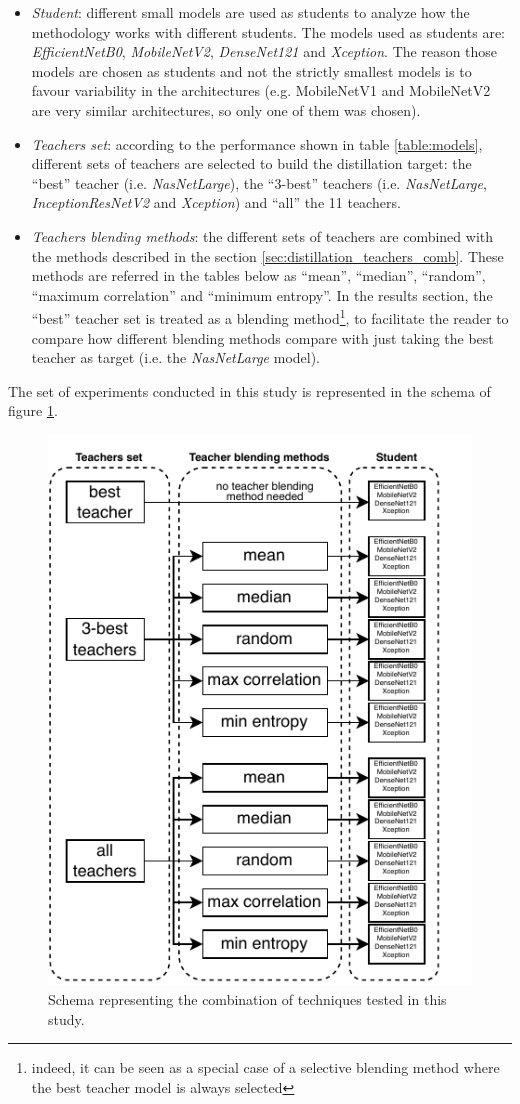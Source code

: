  \begin{itemize}
	 \item \textit{Student}: different small models are used as students to analyze how the methodology works with different students. The models used as students are: \textit{EfficientNetB0}, \textit{MobileNetV2}, \textit{DenseNet121} and \textit{Xception}. The reason those models are chosen as students and not the strictly smallest models is to favour variability in the architectures (e.g. MobileNetV1 and MobileNetV2 are very similar architectures, so only one of them was chosen).
	 \item \textit{Teachers set}: according to the performance shown in table \ref{table:models}, different sets of teachers are selected to build the distillation target: the ``best'' teacher (i.e. \textit{NasNetLarge}), the ``3-best'' teachers (i.e. \textit{NasNetLarge}, \textit{InceptionResNetV2} and \textit{Xception}) and ``all'' the 11 teachers.
	 \item \textit{Teachers blending methods}: the different sets of teachers are combined with the methods described in the section \ref{sec:distillation_teachers_comb}. These methods are referred in the tables below as ``mean'', ``median'', ``random'', ``maximum correlation'' and ``minimum entropy''. In the results section, the ``best'' teacher set is treated as a blending method\footnote{indeed, it can be seen as a special case of a selective blending method where the best teacher model is always selected}, to facilitate the reader to compare how different blending methods compare with just taking the best teacher as target (i.e. the \textit{NasNetLarge} model). 
 \end{itemize}

 The set of experiments conducted in this study is represented in the schema of figure \ref{fig:schema}.

\begin{figure}[h!]
 \centering
 \includegraphics[width=0.6\linewidth]{distillation/images/schema}
 \caption{Schema representing the combination of techniques tested in this study.}
 \label{fig:schema}
\end{figure}


